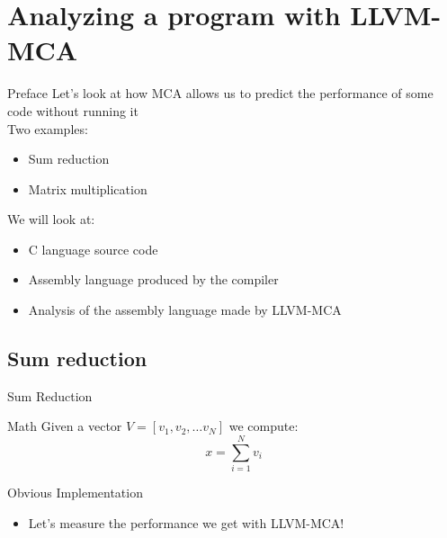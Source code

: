 
\section{Analyzing a program with LLVM-MCA}


\begin{frame}{Preface}
Let's look at how MCA allows us to predict the performance of some code \alert{without running it}\\
\medskip
Two examples:
\begin{itemize}
\item Sum reduction
\item Matrix multiplication
\end{itemize}
\medskip
We will look at:
\begin{itemize}
\item C language source code
\item Assembly language produced by the compiler
\item Analysis of the assembly language made by LLVM-MCA
\end{itemize}
\end{frame}


\subsection{Sum reduction}


\begin{frame}{Sum Reduction}
\begin{block}{Math}
Given a vector $V = [v_1, v_2, \ldots v_N]$ we compute:\\
\[
x = \sum_{i=1}^{N}{v_i}
\]
\end{block}
\begin{block}{Obvious Implementation}
\end{block}
\begin{itemize}
\item Let's measure the performance we get with LLVM-MCA!
\end{itemize}
\end{frame}


